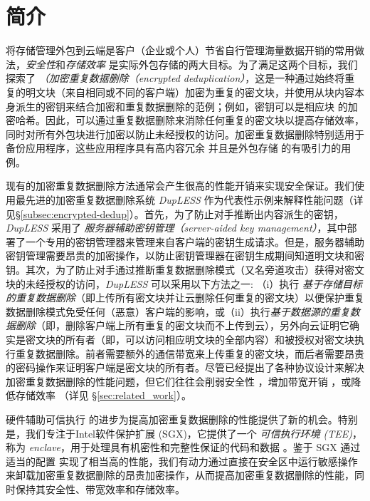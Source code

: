 \section{简介}
\label{sec:introduction}

将存储管理外包到云端是客户（企业或个人）节省自行管理海量数据开销的常用做法，\textit{安全性}和\textit{存储效率} 是实际外包存储的两大目标。为了满足这两个目标，我们探索了 \textit{（加密重复数据删除（encrypted deduplication）}，这是一种通过始终将重复的明文块（来自相同或不同的客户端）加密为重复的密文块，并使用从块内容本身派生的密钥来结合加密和重复数据删除的范例；例如，密钥可以是相应块 \cite{douceur02} 的加密哈希。因此，可以通过重复数据删除来消除任何重复的密文块以提高存储效率，同时对所有外包块进行加密以防止未经授权的访问。加密重复数据删除特别适用于备份应用程序，这些应用程序具有高内容冗余 \cite{wallace12} 并且是外包存储 \cite{hasan05,kotla07,varble09} 的有吸引力的用例。

现有的加密重复数据删除方法通常会产生很高的性能开销来实现安全保证。我们使用最先进的加密重复数据删除系统 {\em DupLESS} \cite{bellare13b} 作为代表性示例来解释性能问题（详见\S\ref{subsec:encrypted-dedup}）。首先，为了防止对手推断出内容派生的密钥，{\em DupLESS} 采用了 \textit{服务器辅助密钥管理（server-aided key management）}，其中部署了一个专用的密钥管理器来管理来自客户端的密钥生成请求。但是，服务器辅助密钥管理需要昂贵的加密操作，以防止密钥管理器在密钥生成期间知道明文块和密钥。其次，为了防止对手通过推断重复数据删除模式（又名旁道攻击\cite{harnik2010side, halevi2011proofs}）获得对密文块的未经授权的访问，{\em DupLESS} 可以采用以下方法之一: （i）执行 \textit{基于存储目标的重复数据删除}（即上传所有密文块并让云删除任何重复的密文块）以便保护重复数据删除模式免受任何（恶意）客户端的影响，或（ii）执行\textit{基于数据源的重复数据删除}（即，删除客户端上所有重复的密文块而不上传到云），另外向云证明它确实是密文块的所有者（即，可以访问相应明文块的全部内容）和被授权对密文块执行重复数据删除。前者需要额外的通信带宽来上传重复的密文块，而后者需要昂贵的密码操作来证明客户端是密文块的所有者。尽管已经提出了各种协议设计来解决加密重复数据删除的性能问题，但它们往往会削弱安全性 \cite{li20b,xu13,pietro12}，增加带宽开销 \cite{harnik10,li15}，或降低存储效率 \cite{zhou15, qin17,li20b}（详见 \S\ref{sec:related_work}）。
  
硬件辅助可信执行 \cite{trustzone,sgx,Mktem,Amdsev} 的进步为提高加密重复数据删除的性能提供了新的机会。特别是，我们专注于Intel软件保护扩展 (SGX)，它提供了一个 \textit{ 可信执行环境 (TEE)}，称为 \textit{ enclave}，用于处理具有机密性和完整性保证的代码和数据 \cite{baumann14 }。鉴于 SGX 通过适当的配置 \cite{harnik18} 实现了相当高的性能，我们有动力通过直接在安全区中运行敏感操作来卸载加密重复数据删除的昂贵加密操作，从而提高加密重复数据删除的性能，同时保持其安全性、带宽效率和存储效率。

